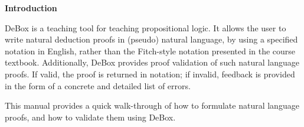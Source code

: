 \documentclass[manual.tex]{subfiles}
\begin{document}
\clearpage
\begin{center}
{\Large \bf Introduction\\}
\end{center}
DeBox is a teaching tool for teaching propositional logic. It allows the
user to write natural deduction proofs in (pseudo) natural language, by
using a specified notation in English, rather than the
Fitch-style notation presented in the course textbook. Additionally,
DeBox provides proof validation of such natural language proofs. If valid,
the proof is returned in  notation; if invalid, feedback is
provided in the form of a concrete and detailed list of errors.

This manual provides a quick walk-through of how to formulate natural
language
proofs, and how to validate them using DeBox.
\end{document}
